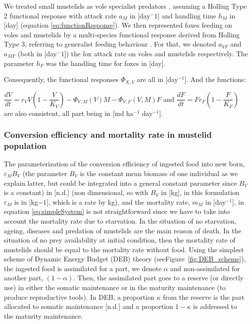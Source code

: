 \documentclass[11pt]{article}
\begin{document}
We treated small mustelids as vole specialist predators \citep{King2006}, assuming a Holling Type 2 functional response with attack rate $a_M$ in [day$^-1$] and handling time $h_M$ in [day] (equation \eqref{eq:functionResponse}). We then represented foxes feeding on voles and mustelids by a multi-species functional response derived from Holling Type 3, referring to generalist feeding behaviour \citep{Baudrot2016}. For that, we denoted $a_{VF}$ and $a_{MF}$ (both in  [day$^-1$]) the fox attack rate on voles and mustelids respectively. The parameter $h_F$ was the handling time for foxes in [day].

Consequently, the functional responses $\Phi_{X,Y}$ are all in [day$^{-1}$].  And the functions:
 
$\dfrac{dV}{dt}  =  r_V V \left( 1- \dfrac{V}{K_V}\right) - \Phi_{V,M}(V)M - \Phi_{V,F}(V,M)F$ and $\dfrac{dF}{dt} = F r_F \left( 1- \dfrac{F}{K_F}\right)$ are also consistent, all part being in [ind ha$^{-1}$ day$^{-1}$].


\subsubsection{Conversion efficiency and mortality rate in mustelid population}

The parameterization of the conversion efficiency of ingested food into new born, $\varepsilon_M B_V$ (the parameter $B_V$ is the constant mean biomass of one individual as we explain latter, but could be integrated into a general constant parameter since $B_V$ is a constant) in [n.d.] (non dimensional, so with $B_V$ in [kg], in this formulation $\varepsilon_M$ is in [kg$ {-1}$], which is a rate by kg), and the mortality rate, $m_M$ in [day$^{-1}$], in equation \eqref{eq:simpleSystem} is not straightforward since we have to take into account the mortality rate due to starvation.
% 
In the situation of no starvation, ageing, diseases and predation of mustelids are the main reason of death. In the situation of no prey availability at initial condition, then the mortality rate of mustelids should be equal to the mortality rate without food. 
Using the simplest scheme of Dynamic Energy Budget (DEB) theory (seeFigure~\ref{fig:DEB_scheme}), the ingested food is assimilated for a part, we denote $\alpha$ and non-assimilated for another part, $(1- \alpha)$. Then, the assimilated part goes to a reserve (or directly use) in either the somatic maintenance or in the maturity maintenance (to produce reproductive tools). In DEB, a proportion $\kappa$ from the reserve is the part allocated to somatic maintenance [n.d.] and a proportion $1-\kappa$ is addressed to the maturity maintenance.
\end{document}
